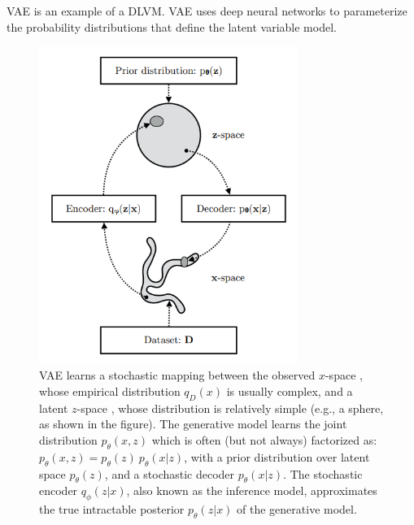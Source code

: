 \documentclass{article}
\begin{document}
VAE is an example of a DLVM. VAE uses deep neural networks to parameterize the probability distributions that define the latent variable model.
\begin{figure}[h]
    \centering
    \includegraphics[width=0.75\textwidth]{fig/vae.png}
    \caption{
	VAE learns a stochastic mapping between the observed $ x $-space , whose empirical distribution $ q_D(x) $ is usually complex, and a latent $ z $-space , whose distribution is relatively simple (e.g., a sphere, as shown in the figure). The generative model learns the joint distribution $ p_\theta(x, z) $ which is often (but not always) factorized as: $ p_\theta(x, z) = p_\theta(z) \ p_\theta(x|z) $, with a prior distribution over latent space
	$ p_\theta(z) $, and a stochastic decoder $ p_\theta(x|z) $. The stochastic encoder $ q_\phi(z|x) $, also known as the inference model, approximates the true intractable posterior $ p_\theta(z|x) $ of the generative model.
    }
    \label{fig:vae}
\end{figure}
\end{document}
